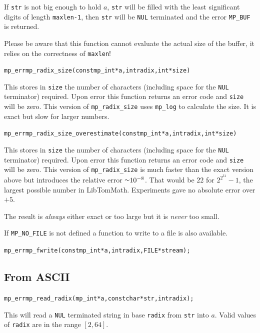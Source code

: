 \documentclass[synpaper]{book}
\def\approx{\raisebox{0.2ex}{\mbox{\small $\sim$}}}
\begin{document}
If \texttt{str} is not big enough to hold $a$, \texttt{str} will be filled with the least
significant digits of length \texttt{maxlen-1}, then \texttt{str} will be \texttt{NUL} terminated
and the error \texttt{MP\_BUF} is returned.

Please be aware that this function cannot evaluate the actual size of the buffer, it relies on the
correctness of \texttt{maxlen}!

\begin{alltt}
mp_err mp_radix_size (const mp_int *a, int radix, int *size)
\end{alltt}
This stores in \texttt{size} the number of characters (including space for the \texttt{NUL}
terminator) required. Upon error this function returns an error code and \texttt{size} will be
zero. This version of \texttt{mp\_radix\_size} uses \texttt{mp\_log} to calculate the size. It
is exact but slow for larger numbers.

\begin{alltt}
mp_err mp_radix_size_overestimate (const mp_int *a, int radix, int *size)
\end{alltt}
This stores in \texttt{size} the number of characters (including space for the \texttt{NUL}
terminator) required. Upon error this function returns an error code and \texttt{size} will be
zero. This version of \texttt{mp\_radix\_size} is much faster than the exact version above but
introduces the relative error $\approx 10^{-8}$. That would be $22$ for $2^{2^{31}}-1$, the
largest possible number in LibTomMath. Experiments gave no absolute error over $+5$.

The result is \emph{always} either exact or too large but it is \emph{never} too small.


If \texttt{MP\_NO\_FILE} is not defined a function to write to a file is also available.

\begin{alltt}
mp_err mp_fwrite(const mp_int *a, int radix, FILE *stream);
\end{alltt}

\subsection{From ASCII}
\begin{alltt}
mp_err mp_read_radix (mp_int *a, const char *str, int radix);
\end{alltt}
This will read a \texttt{NUL} terminated string in base \texttt{radix} from \texttt{str} into $a$.
Valid values of \texttt{radix} are in the range $[2, 64]$.
\end{document}
